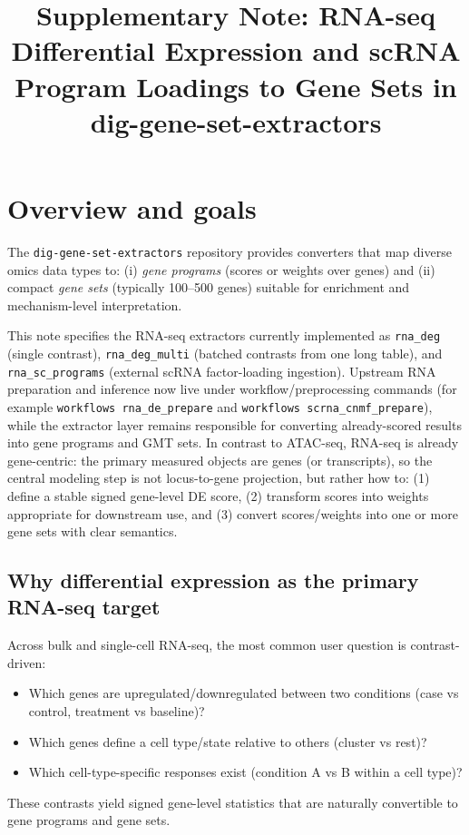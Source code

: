 \documentclass[11pt]{article}
\title{Supplementary Note: RNA-seq Differential Expression and scRNA Program Loadings to Gene Sets in dig-gene-set-extractors}
\author{}
\date{}
\begin{document}
\maketitle

\section*{Overview and goals}
The \texttt{dig-gene-set-extractors} repository provides converters that map diverse omics data types to:
(i) \emph{gene programs} (scores or weights over genes) and
(ii) compact \emph{gene sets} (typically 100--500 genes) suitable for enrichment and mechanism-level interpretation.

This note specifies the RNA-seq extractors currently implemented as \texttt{rna\_deg} (single contrast), \texttt{rna\_deg\_multi} (batched contrasts from one long table), and \texttt{rna\_sc\_programs} (external scRNA factor-loading ingestion). Upstream RNA preparation and inference now live under workflow/preprocessing commands (for example \texttt{workflows rna\_de\_prepare} and \texttt{workflows scrna\_cnmf\_prepare}), while the extractor layer remains responsible for converting already-scored results into gene programs and GMT sets. In contrast to ATAC-seq, RNA-seq is already gene-centric: the primary measured objects are genes (or transcripts), so the central modeling step is not locus-to-gene projection, but rather how to:
(1) define a stable signed gene-level DE score,
(2) transform scores into weights appropriate for downstream use, and
(3) convert scores/weights into one or more gene sets with clear semantics.

\subsection*{Why differential expression as the primary RNA-seq target}
Across bulk and single-cell RNA-seq, the most common user question is contrast-driven:
\begin{itemize}[leftmargin=2em]
\item Which genes are upregulated/downregulated between two conditions (case vs control, treatment vs baseline)?
\item Which genes define a cell type/state relative to others (cluster vs rest)?
\item Which cell-type-specific responses exist (condition A vs B within a cell type)?
\end{itemize}
These contrasts yield signed gene-level statistics that are naturally convertible to gene programs and gene sets.
\end{document}
